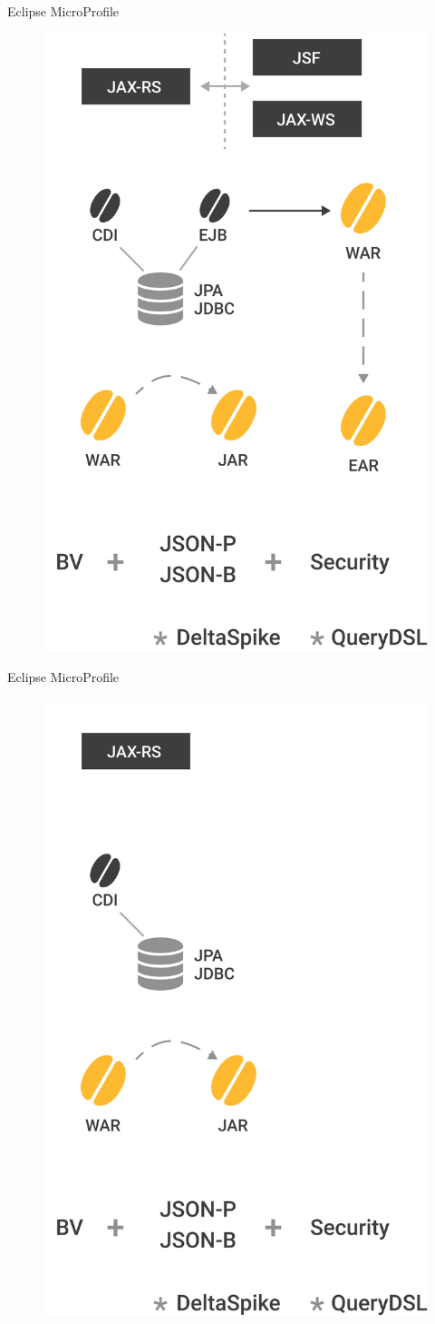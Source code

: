\documentclass[aspectratio=169]{beamer}
\begin{document}
\begin{frame}{Eclipse MicroProfile}
	\begin{figure}
		\centering
		\includegraphics[width=0.4\linewidth]{Images/oldsetup}
	\end{figure}
\end{frame}

\begin{frame}{Eclipse MicroProfile}
\begin{figure}
	\centering
	\includegraphics[width=0.4\linewidth]{Images/newsetup}
\end{figure}
\end{frame}
\end{document}
